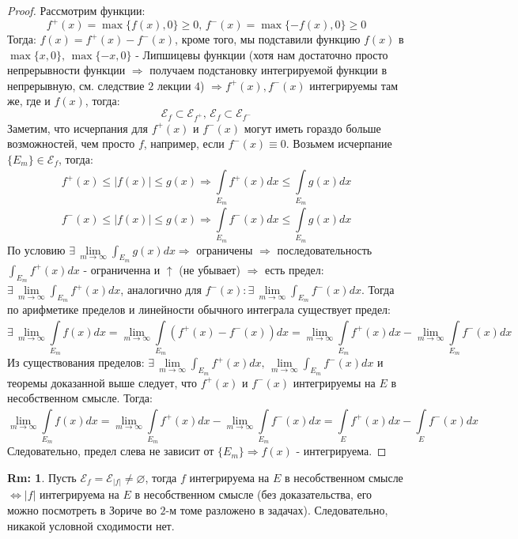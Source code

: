 \documentclass[12pt]{article}
\newcommand{\ME}{\mathcal{E}}
\newcommand{\VN}{\varnothing}
\theoremstyle{definition}
\newtheorem{rem}{Rm:}
\newcommand{\ddint}[2]{\displaystyle\int\limits_{#1}^{#2}}
\begin{document}
\begin{proof}
	Рассмотрим функции: 
	$$
		f^+(x) = \max\{f(x), 0\} \geq 0, \, f^{-}(x) = \max\{-f(x),0\} \geq 0
	$$
	Тогда: $f(x) = f^+(x) - f^-(x)$, кроме того, мы подставили функцию $f(x)$ в $\max\{x,0\}, \, \max\{-x,0\}$ - Липшицевы функции (хотя нам достаточно просто непрерывности функции $\Rightarrow$ получаем подстановку интегрируемой функции в непрерывную, см. следствие $2$ лекции $4$) $\Rightarrow f^+(x), f^-(x)$ интегрируемы там же, где и $f(x)$, тогда: 
	$$
		\ME_f \subset \ME_{f^+}, \, \ME_f \subset \ME_{f^-}
	$$ 
	Заметим, что исчерпания для $f^+(x)$ и $f^-(x)$ могут иметь гораздо больше возможностей, чем просто $f$, например, если $f^-(x) \equiv 0$. Возьмем исчерпание $\{E_m\} \in \ME_f$, тогда:
	$$
		f^+(x) \leq |f(x)|\leq g(x) \Rightarrow \ddint{E_m}{}f^+(x)dx \leq \ddint{E_m}{}g(x)dx
	$$
	$$
		 f^-(x) \leq |f(x)|\leq g(x) \Rightarrow \ddint{E_m}{}f^-(x)dx \leq \ddint{E_m}{}g(x)dx
	$$
	По условию $\exists\, \lim\limits_{m \to \infty}\int_{E_m}g(x)dx \Rightarrow$ ограничены $\Rightarrow$ последовательность $\int_{E_m}f^+(x)dx$ - ограниченна и $\uparrow$ (не убывает) $\Rightarrow$ есть предел: $\exists \, \lim\limits_{m \to \infty}\int_{E_m}f^+(x)dx$, аналогично для $f^{-}(x) \colon \exists \, \lim\limits_{m \to \infty}\int_{E_m}f^-(x)dx$. Тогда по арифметике пределов и линейности обычного интеграла существует предел:
	$$
		\exists \, \lim\limits_{m \to \infty}\ddint{E_m}{}f(x)dx = \lim\limits_{m \to \infty}\ddint{E_m}{}(f^+(x) - f^-(x))dx = \lim\limits_{m \to \infty}\ddint{E_m}{}f^+(x)dx - \lim\limits_{m \to \infty}\ddint{E_m}{}f^-(x)dx
	$$
	Из существования пределов: $\exists \, \lim\limits_{m \to \infty}\int_{E_m}f^+(x)dx, \, \lim\limits_{m \to \infty}\int_{E_m}f^-(x)dx$ и теоремы доказанной выше следует, что $f^+(x)$ и $f^-(x)$ интегрируемы на $E$ в несобственном смысле. Тогда:
	$$
		\lim\limits_{m \to \infty}\ddint{E_m}{}f(x)dx = \lim\limits_{m \to \infty}\ddint{E_m}{}f^+(x)dx - \lim\limits_{m \to \infty}\ddint{E_m}{}f^-(x)dx = \ddint{E}{}f^+(x)dx - \ddint{E}{}f^-(x)dx 
	$$
	Следовательно, предел слева не зависит от $\{E_m\} \Rightarrow f(x)$ - интегрируема.
\end{proof}

\begin{rem}
	Пусть $\ME_f = \ME_{|f|} \neq \VN$, тогда $f$ интегрируема на $E$ в несобственном смысле $\Leftrightarrow |f|$ интегрируема на $E$ в несобственном смысле (без доказательства, его можно посмотреть в Зориче во $2$-м томе разложено в задачах). Следовательно, никакой условной сходимости нет.
\end{rem}
\end{document}
